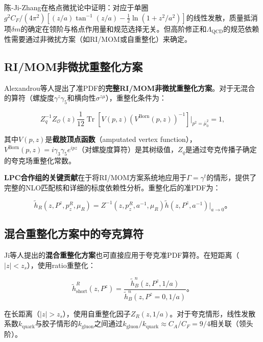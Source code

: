 \documentclass[12pt,a4paper]{ctexart}
\theoremstyle{definition}
\begin{document}
陈-Ji-Zhang\cite{Chen2016improved}在格点微扰论中证明：对应于单圈$g^2C_F/(4\pi^2)[(z/a)\tan^{-1}(z/a) - \frac{1}{2}\ln(1+z^2/a^2)]$的线性发散，质量抵消项$\delta m$的确定在领阶与格点作用量和规范选择无关。但高阶修正和$\Lambda_{\text{QCD}}$的规范依赖性需要通过非微扰方案（如RI/MOM或自重整化\cite{Huo2021self}）来确定。

\subsection{RI/MOM非微扰重整化方案}

Alexandrou等人\cite{Alexandrou2017}提出了准PDF的\textbf{完整RI/MOM非微扰重整化方案}。对于无混合的算符（螺旋度$\gamma^z\gamma_5$和横向性$\sigma^{z\mu}$），重整化条件为：

\begin{equation}
\boxed{Z^{-1}_q Z_{\mathcal{O}}(z) \frac{1}{12}\operatorname{Tr}\left[ V(p, z) \left(V^{\text{Born}}(p, z)\right)^{-1} \right] \Big|_{p^2 = \bar{\mu}^2_0} = 1},
\label{eq:RI_MOM_condition}
\end{equation}

其中$V(p,z)$是\textbf{截肢顶点函数}（amputated vertex function），$V^{\text{Born}}(p,z) = i\gamma_3\gamma_5 e^{ipz}$（对螺旋度算符）是其树级值，$Z_q$是通过夸克传播子确定的夸克场重整化常数。

\textbf{LPC合作组的关键贡献}\cite{Liu2019isovector}在于将RI/MOM方案系统地应用于$\Gamma = \gamma^t$的情形，提供了完整的NLO匹配核和详细的标度依赖性分析。重整化后的准PDF为：

\begin{equation}
\tilde{h}_R(z, P^z, p^R_z, \mu_R) = Z^{-1}(z, p^R_z, a^{-1}, \mu_R) \tilde{h}(z, P^z, a^{-1}) \big|_{a \to 0}。
\label{eq:renorm_ME}
\end{equation}

\subsection{混合重整化方案中的夸克算符}

Ji等人提出的\textbf{混合重整化方案}\cite{Ji2021hybrid}也可直接应用于夸克准PDF算符。在短距离（$|z| < z_s$），使用ratio重整化：

\begin{equation}
\tilde{h}^R_{\text{short}}(z, P^z) = \frac{\tilde{h}^n_B(z, P^z, 1/a)}{\tilde{h}^n_B(z, P^z = 0, 1/a)}。
\end{equation}

在长距离（$|z| > z_s$），使用自重整化因子$Z_R(z, 1/a)$。对于夸克情形，线性发散系数$k_{\text{quark}}$与胶子情形的$k_{\text{gluon}}$之间通过$k_{\text{gluon}}/k_{\text{quark}} \approx C_A/C_F = 9/4$相关联（领头阶）。
\end{document}

